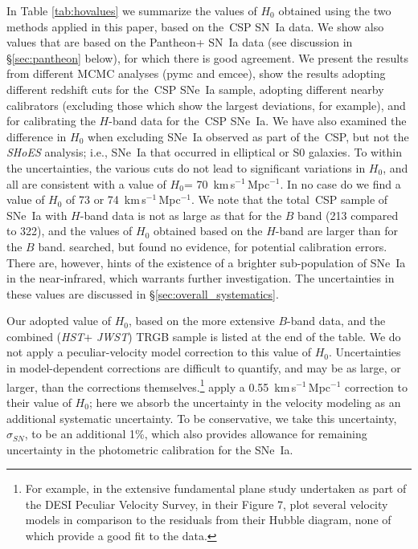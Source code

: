 \documentclass[12pt,modern]{aastex631}
\newcommand{\csp}{\,CSP\xspace}
\newcommand{\ho}{$H_{0}$\xspace}
\newcommand{\hounits}{\,km\,s$^{-1}$\,Mpc$^{-1}$\xspace}
\newcommand{\hst}{\emph{HST}\xspace}
\newcommand{\jwst}{\emph{JWST}\xspace}
\newcommand{\sne}{SNe~Ia\xspace}
\newcommand{\sn}{SN~Ia\xspace}
\newcommand{\shoes}{\emph{SHoES}\xspace}
\begin{document}
In Table \ref{tab:hovalues} we summarize the values of \ho obtained using the two methods applied in this paper, based on the \csp \sn data. We show also values that are based on the Pantheon+ \sn data (see discussion in \S\ref{sec:pantheon} below), for which there is good agreement. We present the results from different MCMC analyses ({\ttfamily pymc} and {\ttfamily emcee}), show the results adopting different redshift cuts for the \csp \sne sample, adopting different nearby calibrators (excluding those which show the largest deviations, for example), and for calibrating the $H$-band data for the \csp \sne. We have also examined the difference in \ho when excluding \sne observed as part of the \csp, but not the \shoes analysis; i.e., \sne that occurred in elliptical or S0 galaxies. To within the uncertainties, the various cuts do not lead to significant variations in \ho, and all are consistent with a value of \ho = 70 \hounits. In no case do we find a value of \ho of 73 or 74 \hounits.    We note that the total \csp sample of \sne with $H$-band data is not as large as that for the $B$ band (213 compared to 322), and the values of \ho obtained based on the  $H$-band  are larger than for the $B$ band. \citet{uddin_2024} searched, but found no evidence, for potential calibration errors. There are, however, hints of the existence of a brighter sub-population of \sne in the near-infrared, which warrants further investigation. The uncertainties in these values are discussed in \S\ref{sec:overall_systematics}. 

Our adopted value of \ho, based on the more extensive $B$-band data, and the combined (\hst + \jwst) TRGB sample is listed at the end of the table. We do not apply a peculiar-velocity model correction to this value of \ho. Uncertainties in model-dependent corrections are difficult to quantify, and may be as large, or larger, than the corrections themselves.\footnote{For example, in the extensive fundamental plane study undertaken as part of the DESI Peculiar Velocity Survey, in their Figure 7,  \citet{said_2024} plot several velocity models \citep[e.g.,][]{carrick_2015} in comparison to the residuals from their Hubble diagram, none of which provide a good fit to the data.} \citet{uddin_2024} apply a 0.55 \hounits correction to their value of \ho; here we absorb the uncertainty in the velocity modeling as an additional systematic uncertainty. To be conservative, we take this uncertainty, $\sigma_{SN}$, to be an additional 1\%, which also provides allowance for remaining uncertainty in the photometric calibration for the \sne. 
\end{document}
